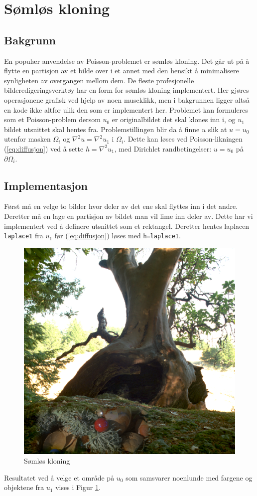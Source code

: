 \newpage
\section{Sømløs kloning}
\label{sec:kloning}
\subsection{Bakgrunn}
En populær anvendelse av Poisson-problemet er sømløs kloning. Det går ut på å flytte en partisjon av et bilde over i et annet med den hensikt å minimalisere synligheten av overgangen mellom dem. De fleste profesjonelle bilderedigeringsverktøy har en form for sømløs kloning implementert. Her gjøres operasjonene grafisk ved hjelp av noen museklikk, men i bakgrunnen ligger altså en kode ikke altfor ulik den som er implementert her.\newline
Problemet kan formuleres som et Poisson-problem dersom $u_0$ er originalbildet det skal klones inn i, og $u_1$ bildet utsnittet skal hentes fra. Problemstillingen blir da å finne $u$ slik at $u=u_0$ utenfor masken $\Omega_i$ og $\nabla^2 u = \nabla^2 u_1$ i $\Omega_i$. Dette kan løses ved Poisson-likningen (\ref{eq:diffusjon}) ved å sette $h=\nabla^2 u_1$, med Dirichlet randbetingelser: $u=u_0$ på $\partial \Omega_i$. 

\subsection{Implementasjon}
Først må en velge to bilder hvor deler av det ene skal flyttes inn i det andre. Deretter må en lage en partisjon av bildet man vil lime inn deler av. Dette har vi implementert ved å definere utsnittet som et rektangel. Deretter hentes laplacen \texttt{laplace1} fra $u_1$ før (\ref{eq:diffusjon}) løses med \texttt{h=laplace1}.
\begin{figure}
\begin{center}
    \includegraphics[width=0.8\columnwidth]{bilder/somlos.png}
    \caption{Sømløs kloning
    \label{Figur 7}} 
\end{center}
\end{figure}
Resultatet ved å velge et område på $u_0$ som samsvarer noenlunde med fargene og objektene fra $u_1$ vises i Figur \ref{Figur 7}. 